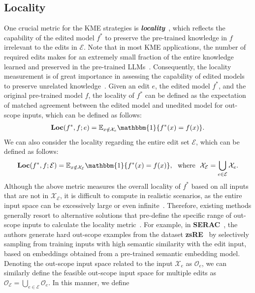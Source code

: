 \documentclass[acmsmall, screen]{acmart}
\begin{document}
\subsection{Locality}
One crucial metric for the KME strategies is \textit{\textbf{locality}}~{\cite{cao2021editing,
mitchell2022fast,
cheng2023editing,
li2023pmet}}, which reflects the capability of the edited model $f^{*}$ to preserve the pre-trained knowledge in $f$ irrelevant to the edits in $\mathcal{E}$. Note that in most KME applications, the number of required edits makes for an extremely small fraction of the entire knowledge learned and preserved in the pre-trained LLMs~\cite{yao2023editing,zhang2024comprehensive}. Consequently, the locality measurement is of great importance in assessing the capability of edited models to preserve unrelated knowledge~{\cite{Patch,MemPrompt,gupta2023editing}}. Given an edit $e$, the edited model $f^{*}$, and the original pre-trained model $f$, {the locality of $f^{*}$ can be defined as the expectation of matched agreement between the edited model and unedited model for out-scope inputs, which can be defined as follows:}
\begin{equation}
\label{eq:true_e}
          \textbf{Loc}(f^{*}, f; e)=\mathbb{E}_{x \notin \mathcal{X}_{e}} \mathbbm{1}\{f^*(x)= f(x)\}.
\end{equation}
We can also consider the locality regarding the entire edit set $\mathcal{E}$, which can be defined as follows:
\begin{equation}
\label{eq:true_be}
        \textbf{Loc}(f^{*}, f; \mathcal{E})=\mathbb{E}_{x \notin \mathcal{X}_{\mathcal{E}}} \mathbbm{1}\{f^*(x)= f(x)\}, \ \ \text{where}\ \ \mathcal{X}_{\mathcal{E}}=\bigcup_{e\in\mathcal{E}}\mathcal{X}_e.
\end{equation}
Although the above metric measures the overall locality of $f^{*}$ based on all inputs that are not in $\mathcal{X}_{\mathcal{E}}$, it is difficult to compute in realistic scenarios, as the entire input space can be excessively large or even infinite~\cite{yao2023editing}. Therefore, existing methods generally resort to alternative solutions that pre-define the specific range of out-scope inputs to calculate the locality metric~{\cite{cao2021editing,dai2022knowledge,meng2022locating,p4,e2}}. 
For example, in \textbf{SERAC}~\cite{SERAC}, the authors generate hard out-scope examples from the dataset \textbf{zsRE}~\cite{levy2017zero} by selectively sampling from training inputs with high semantic similarity with the edit input, based on embeddings obtained from a pre-trained semantic embedding model. Denoting the out-scope input space related to the input $\mathcal{X}_{e}$ as $\mathcal{O}_{e}$, we can similarly define the feasible out-scope input space for multiple edits as $\mathcal{O}_{\mathcal{E}}=\bigcup_{e\in\mathcal{E}}\mathcal{O}_e$. In this manner, we define
\end{document}
